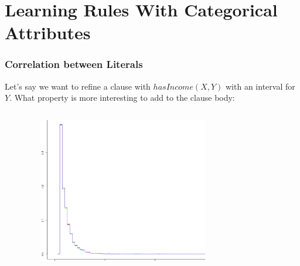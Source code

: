 \documentclass{beamer}
\begin{document}
\section{Learning Rules With Categorical Attributes}
\begin{frame}
\frametitle{Correlation between Literals}
Let's say we want to refine a clause with $hasIncome(X,Y)$ with an interval for $Y$.
What property is more interesting to add to the clause body:
\begin{columns}[c]
    \begin{fontsize}{7}{8}
    \end{fontsize}
    \begin{figure}
    \includegraphics[width=1\linewidth]{./Figures/income-birthquarter-zoom.png}
    \end{figure}
    \begin{fontsize}{7}{8}
    \end{fontsize}
    \begin{figure}

\end{figure}
\end{columns}
\end{frame}
\end{document}
